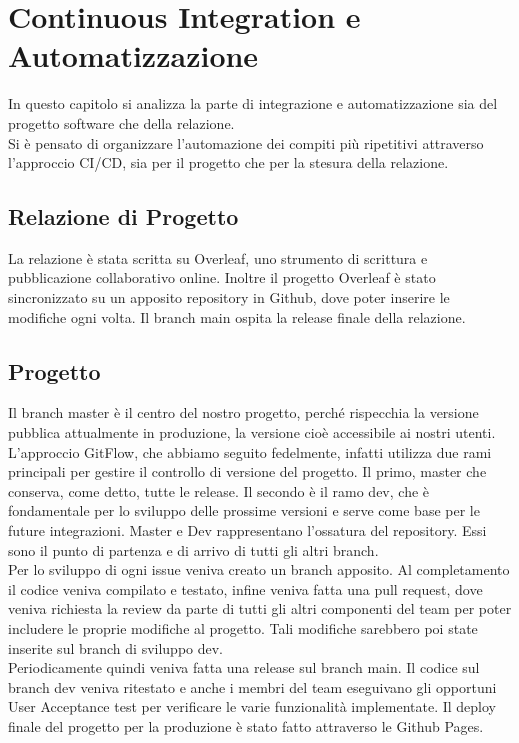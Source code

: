     

\section{Continuous Integration e Automatizzazione}
\label{chap:CI}
In questo capitolo si analizza la parte di integrazione e automatizzazione sia del progetto software che della relazione.\\  Si è pensato di organizzare l'automazione dei compiti più ripetitivi attraverso l'approccio CI/CD, sia per il progetto che per la stesura della relazione.
    \subsection{Relazione di Progetto}
        La relazione è stata scritta su Overleaf, uno strumento di scrittura e pubblicazione collaborativo online.
        Inoltre il progetto Overleaf è stato sincronizzato su un apposito repository in Github, dove poter inserire le modifiche ogni volta. Il branch main ospita la release finale della relazione. 
        
    \subsection{Progetto}
   
        Il branch master è il centro del nostro progetto, perché rispecchia la versione pubblica attualmente in produzione, la versione cioè accessibile ai nostri utenti. L’approccio GitFlow, che abbiamo seguito fedelmente, infatti utilizza due rami principali per gestire il controllo di versione del progetto. Il primo, master che conserva, come detto, tutte le release. Il secondo è il ramo dev, che è fondamentale per lo sviluppo delle prossime versioni e serve come base per le future integrazioni. Master e Dev rappresentano l'ossatura del repository. Essi sono il punto di partenza e di arrivo di tutti gli altri branch.\\
    Per lo sviluppo di ogni issue veniva creato un branch apposito. Al completamento il codice veniva compilato e testato, infine veniva fatta una pull request, dove veniva richiesta la review da parte di tutti gli altri componenti del team per poter includere le proprie modifiche al progetto. Tali modifiche sarebbero poi state inserite sul branch di sviluppo dev. \\
    Periodicamente quindi veniva fatta una release sul branch main. Il codice sul branch dev veniva ritestato e anche i membri del team eseguivano gli opportuni User Acceptance test per verificare le varie funzionalità implementate. 
    Il deploy finale del progetto per la produzione è stato fatto attraverso le Github Pages.
   
        
        





